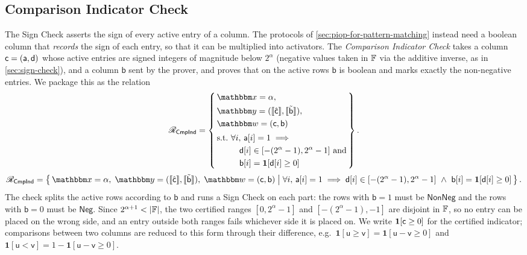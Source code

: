 \subsection{Comparison Indicator Check}
\label{sec:cmp-indicator}
The Sign Check asserts the sign of every active entry of a column. The protocols of \cref{sec:piop-for-pattern-matching} instead need a boolean column that \emph{records} the sign of each entry, so that it can be multiplied into activators. The \emph{Comparison Indicator Check} takes a column $\mathsf{c} = (\mathsf{a},\mathsf{d})$ whose active entries are signed integers of magnitude below $2^\alpha$ (negative values taken in $\mathbb{F}$ via the additive inverse, as in \cref{sec:sign-check}), and a column $\mathsf{b}$ sent by the prover, and proves that on the active rows $\mathsf{b}$ is boolean and marks exactly the non-negative entries. We package this as the relation
\ifsp
\begin{displaymath}
\NPRelation_{\mathsf{CmpInd}} = \left\{\,
  \begin{aligned}
    & \NPInstance = \alpha,\\
    & \NPInstancey = (\Oracle{\hat{\col}}, \Oracle{\MLE{\mathsf{b}}}),\\
    & \NPWitness = (\col, \mathsf{b})\\[2pt]
    & \text{s.t.}\ \forall i,\, \mathsf{a}[i] = 1 \implies{}\\
    & \phantom{\text{s.t.}}\ \quad \mathsf{d}[i] \in [-(2^\alpha-1), 2^\alpha-1]\ \text{and}\\
    & \phantom{\text{s.t.}}\ \quad \mathsf{b}[i] = \mathbf{1}[\mathsf{d}[i] \ge 0]
  \end{aligned}
\,\right\}.
\end{displaymath}
\else
\begin{displaymath}
\NPRelation_{\mathsf{CmpInd}} = \left\{\,
  \NPInstance = \alpha,\;
  \NPInstancey = (\Oracle{\hat{\col}}, \Oracle{\MLE{\mathsf{b}}}),\;
  \NPWitness = (\col, \mathsf{b})
  \;\middle|\;
    \forall i,\, \mathsf{a}[i] = 1 \implies \mathsf{d}[i] \in [-(2^\alpha-1), 2^\alpha-1]\ \wedge\ \mathsf{b}[i] = \mathbf{1}[\mathsf{d}[i] \ge 0]
\,\right\}.
\end{displaymath}
\fi
The check splits the active rows according to $\mathsf{b}$ and runs a Sign Check on each part: the rows with $\mathsf{b} = 1$ must be $\mathsf{NonNeg}$ and the rows with $\mathsf{b} = 0$ must be $\mathsf{Neg}$. Since $2^{\alpha+1} < |\mathbb{F}|$, the two certified ranges $[0, 2^\alpha-1]$ and $[-(2^\alpha-1), -1]$ are disjoint in $\mathbb{F}$, so no entry can be placed on the wrong side, and an entry outside both ranges fails whichever side it is placed on. We write $\mathbf{1}[\mathsf{c} \ge 0]$ for the certified indicator; comparisons between two columns are reduced to this form through their difference, e.g.\ $\mathbf{1}[\mathsf{u} \ge \mathsf{v}] = \mathbf{1}[\mathsf{u} - \mathsf{v} \ge 0]$ and $\mathbf{1}[\mathsf{u} < \mathsf{v}] = 1 - \mathbf{1}[\mathsf{u} - \mathsf{v} \ge 0]$.
